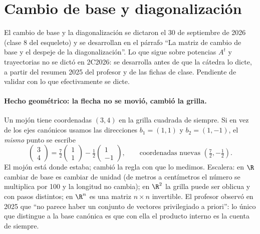 \section{Cambio de base y diagonalización}\label{sec:cambio-base}

{\small\vspace{1mm}\par}
{\small\vspace{1mm}\par}


\begin{atencion}[Anticipado]
El cambio de base y la diagonalización se dictaron el 30 de septiembre de 2026 (clase 8 del
esqueleto) y se desarrollan en el párrafo ``La matriz de cambio de base y el despeje de la
diagonalización''. Lo que sigue sobre potencias \(A^t\) y trayectorias no se dictó en 2C2026: se
desarrolla antes de que la cátedra lo dicte, a partir del resumen 2025 del profesor y de las
fichas de clase. Pendiente de validar con lo que efectivamente se dicte.
\end{atencion}

\paragraph{Hecho geométrico: la flecha no se movió, cambió la grilla.} Un mojón tiene
coordenadas \((3,4)\) en la grilla cuadrada de siempre. Si en vez de los ejes canónicos usamos
las direcciones \(b_1=(1,1)\) y \(b_2=(1,-1)\), el \emph{mismo} punto se escribe
\[
  \begin{pmatrix}3\\4\end{pmatrix}
  =\tfrac72\begin{pmatrix}1\\1\end{pmatrix}-\tfrac12\begin{pmatrix}1\\-1\end{pmatrix},
  \qquad\text{coordenadas nuevas }(\tfrac72,-\tfrac12).
\]
El mojón está donde estaba; cambió la regla con que lo medimos. Escalera: en \(\R\) cambiar
de base es cambiar de unidad (de metros a centímetros el número se multiplica por 100 y la
longitud no cambia); en \(\R^2\) la grilla puede ser oblicua y con pasos distintos; en
\(\R^n\) es una matriz \(n\times n\) invertible. El profesor observó en 2025 que ``no parece
haber un conjunto de vectores privilegiado a priori'': lo único que distingue a la base
canónica es que con ella el producto interno es la cuenta de siempre.

